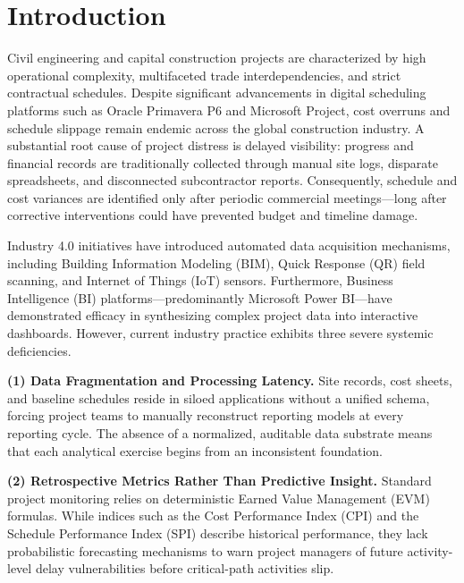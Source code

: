 \documentclass[conference]{IEEEtran}
\begin{document}
\section{Introduction}

Civil engineering and capital construction projects are characterized by high operational complexity, multifaceted trade interdependencies, and strict contractual schedules. Despite significant advancements in digital scheduling platforms such as Oracle Primavera P6 and Microsoft Project, cost overruns and schedule slippage remain endemic across the global construction industry. A substantial root cause of project distress is delayed visibility: progress and financial records are traditionally collected through manual site logs, disparate spreadsheets, and disconnected subcontractor reports. Consequently, schedule and cost variances are identified only after periodic commercial meetings---long after corrective interventions could have prevented budget and timeline damage.

Industry 4.0 initiatives have introduced automated data acquisition mechanisms, including Building Information Modeling (BIM), Quick Response (QR) field scanning, and Internet of Things (IoT) sensors. Furthermore, Business Intelligence (BI) platforms---predominantly Microsoft Power BI---have demonstrated efficacy in synthesizing complex project data into interactive dashboards. However, current industry practice exhibits three severe systemic deficiencies.

\textbf{(1) Data Fragmentation and Processing Latency.} Site records, cost sheets, and baseline schedules reside in siloed applications without a unified schema, forcing project teams to manually reconstruct reporting models at every reporting cycle. The absence of a normalized, auditable data substrate means that each analytical exercise begins from an inconsistent foundation.

\textbf{(2) Retrospective Metrics Rather Than Predictive Insight.} Standard project monitoring relies on deterministic Earned Value Management (EVM) formulas. While indices such as the Cost Performance Index (CPI) and the Schedule Performance Index (SPI) describe historical performance, they lack probabilistic forecasting mechanisms to warn project managers of future activity-level delay vulnerabilities before critical-path activities slip.
\end{document}
